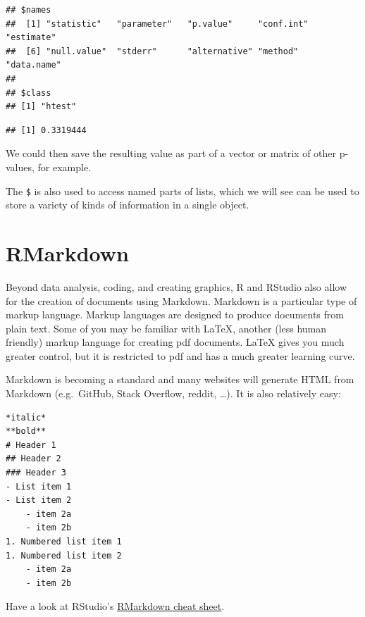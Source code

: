 \documentclass[
]{book}
\newenvironment{Shaded}{\begin{snugshade}}{\end{snugshade}}
\newcommand{\NormalTok}[1]{#1}
\newcommand{\SpecialCharTok}[1]{\textcolor[rgb]{0.00,0.00,0.00}{#1}}
\begin{document}
\begin{verbatim}
## $names
##  [1] "statistic"   "parameter"   "p.value"     "conf.int"    "estimate"   
##  [6] "null.value"  "stderr"      "alternative" "method"      "data.name"  
## 
## $class
## [1] "htest"
\end{verbatim}

\begin{Shaded}
\end{Shaded}

\begin{verbatim}
## [1] 0.3319444
\end{verbatim}

We could then save the resulting value as part of a vector or matrix of other p-values, for example.

The \texttt{\$} is also used to access named parts of lists, which we will see can be used to store a variety of kinds of information in a single object.

\hypertarget{rmarkdown}{%
\section{RMarkdown}\label{rmarkdown}}

Beyond data analysis, coding, and creating graphics, R and RStudio also allow for the creation of documents using Markdown. Markdown is a particular type of markup language. Markup languages are designed to produce documents from plain text. Some of you may be familiar with LaTeX, another (less human friendly) markup language for creating pdf documents. LaTeX gives you much greater control, but it is restricted to pdf and has a much greater learning curve.

Markdown is becoming a standard and many websites will generate HTML from Markdown (e.g.~GitHub, Stack Overflow, reddit, \ldots). It is also relatively easy:

\begin{verbatim}
*italic*
**bold**
# Header 1
## Header 2
### Header 3
- List item 1
- List item 2
    - item 2a
    - item 2b
1. Numbered list item 1
1. Numbered list item 2
    - item 2a
    - item 2b
\end{verbatim}

Have a look at RStudio's \href{https://www.rstudio.com/resources/cheatsheets/}{RMarkdown cheat sheet}.
\end{document}
